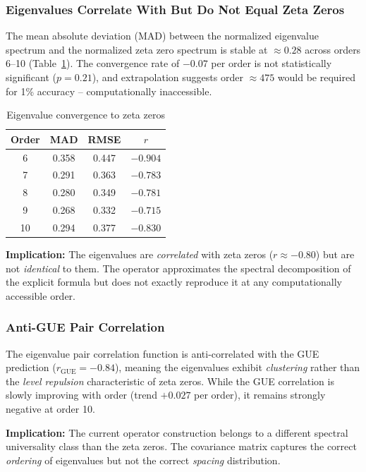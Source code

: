 \documentclass[11pt,a4paper]{article}
\begin{document}
\subsubsection{Eigenvalues Correlate With But Do Not Equal Zeta Zeros}

The mean absolute deviation (MAD) between the normalized eigenvalue
spectrum and the normalized zeta zero spectrum is stable at
$\approx 0.28$ across orders 6--10 (Table~\ref{tab:convergence}).
The convergence rate of $-0.07$ per order is not statistically
significant ($p = 0.21$), and extrapolation suggests order $\approx
475$ would be required for 1\% accuracy -- computationally inaccessible.

\begin{table}[h]
\centering
\caption{Eigenvalue convergence to zeta zeros}
\label{tab:convergence}
\begin{tabular}{cccc}
\toprule
Order & MAD & RMSE & $r$ \\
\midrule
6  & 0.358 & 0.447 & $-0.904$ \\
7  & 0.291 & 0.363 & $-0.783$ \\
8  & 0.280 & 0.349 & $-0.781$ \\
9  & 0.268 & 0.332 & $-0.715$ \\
10 & 0.294 & 0.377 & $-0.830$ \\
\bottomrule
\end{tabular}
\end{table}

\textbf{Implication:} The eigenvalues are \emph{correlated} with zeta
zeros ($r \approx -0.80$) but are not \emph{identical} to them.  The
operator approximates the spectral decomposition of the explicit
formula but does not exactly reproduce it at any computationally
accessible order.

\subsubsection{Anti-GUE Pair Correlation}

The eigenvalue pair correlation function is anti-correlated with the
GUE prediction ($r_{\text{GUE}} = -0.84$), meaning the eigenvalues
exhibit \emph{clustering} rather than the \emph{level repulsion}
characteristic of zeta zeros.  While the GUE correlation is slowly
improving with order (trend $+0.027$ per order), it remains strongly
negative at order 10.

\textbf{Implication:} The current operator construction belongs to a
different spectral universality class than the zeta zeros.  The
covariance matrix captures the correct \emph{ordering} of eigenvalues
but not the correct \emph{spacing} distribution.
\end{document}
